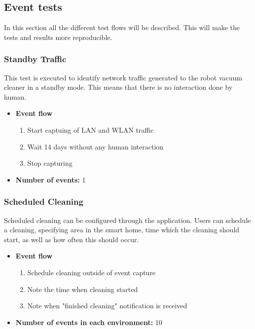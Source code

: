 \subsection{Event tests}
In this section all the different test flows will be described. This will make the tests and results more reproducible. 

\subsubsection{Standby Traffic}
This test is executed to identify network traffic generated to the robot vacuum cleaner in a standby mode. This means that there is no interaction done by human. 

\begin{itemize}
    \item \textbf{Event flow} \begin{enumerate}
                                    \item Start captuing of LAN and WLAN traffic
                                    \item Wait 14 days without any human interaction
                                    \item Stop capturing
                                \end{enumerate}
    \item \textbf{Number of events:} 1
\end{itemize}

\subsubsection{Scheduled Cleaning}
Scheduled cleaning can be configured through the application. Users can schedule a cleaning, specifying area in the smart home, time which the cleaning should start, as well as how often this should occur. 
\begin{itemize}
    \item \textbf{Event flow} \begin{enumerate}
                                    \item Schedule cleaning outside of event capture
                                    \item Note the time when cleaning started
                                    \item Note when "finished cleaning" notification is received
                                \end{enumerate}
    \item \textbf{Number of events in each environment:} 10
\end{itemize}

